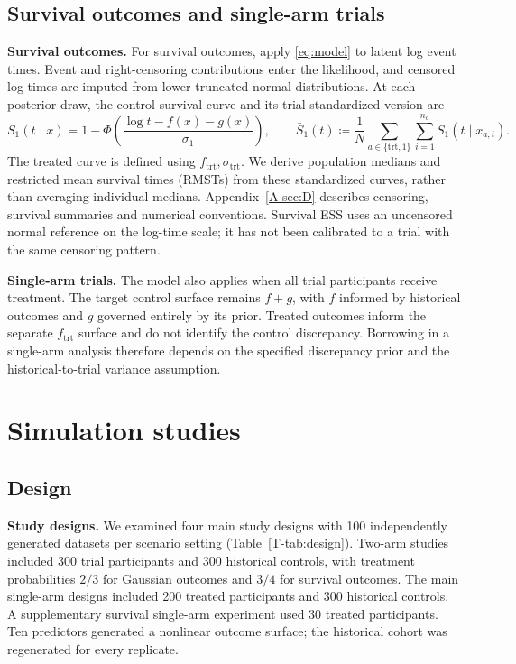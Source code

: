 \documentclass[11pt]{article}
\begin{document}
\subsection{Survival outcomes and single-arm trials}
\noindent\textbf{Survival outcomes.}
For survival outcomes, apply \eqref{eq:model} to latent log event times. Event and right-censoring contributions enter the likelihood, and censored log times are imputed from lower-truncated normal distributions. At each posterior draw, the control survival curve and its trial-standardized version are
\begin{equation}\label{eq:survival}
S_1(t\mid x)=1-\Phi\!\left(\frac{\log t-f(x)-g(x)}{\sigma_1}\right),\qquad
\bar S_1(t)\coloneqq \frac1N\sum_{a\in\{\mathrm{trt},1\}}\sum_{i=1}^{n_a} S_1(t\mid x_{a,i}).
\end{equation}
The treated curve is defined using $f_{\mathrm{trt}},\sigma_{\mathrm{trt}}$. We derive population medians and restricted mean survival times (RMSTs) from these standardized curves, rather than averaging individual medians. Appendix~\ref{A-sec:D} describes censoring, survival summaries and numerical conventions. Survival ESS uses an uncensored normal reference on the log-time scale; it has not been calibrated to a trial with the same censoring pattern.

\noindent\textbf{Single-arm trials.}
The model also applies when all trial participants receive treatment. The target control surface remains $f+g$, with $f$ informed by historical outcomes and $g$ governed entirely by its prior. Treated outcomes inform the separate $f_{\mathrm{trt}}$ surface and do not identify the control discrepancy. Borrowing in a single-arm analysis therefore depends on the specified discrepancy prior and the historical-to-trial variance assumption.

\section{Simulation studies}
\subsection{Design}
\noindent\textbf{Study designs.}
We examined four main study designs with 100 independently generated datasets per scenario setting (Table~\ref{T-tab:design}). Two-arm studies included 300 trial participants and 300 historical controls, with treatment probabilities $2/3$ for Gaussian outcomes and $3/4$ for survival outcomes. The main single-arm designs included 200 treated participants and 300 historical controls. A supplementary survival single-arm experiment used 30 treated participants. Ten predictors generated a nonlinear outcome surface; the historical cohort was regenerated for every replicate.
\end{document}
